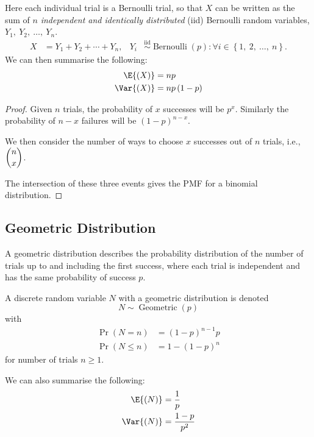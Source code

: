 \documentclass{article}
\begin{document}
Here each individual trial is a Bernoulli trial, so that \(X\) can be written as the sum of
\(n\) \textit{independent and identically distributed} (iid) Bernoulli random variables, \(Y_1,\: Y_2,\: \dots,\: Y_n\).
\begin{align*}
    X & = Y_1 + Y_2 + \cdots + Y_n, & Y_i & \overset{\mathrm{iid}}{\sim} \operatorname{Bernoulli}{\left( p \right)} : \forall i \in \left\{ 1,\: 2,\: \dots,\: n \right\}.
\end{align*}
We can then summarise the following:
\begin{align*}
    \E{\left( X \right)}   & = np                      \\
    \Var{\left( X \right)} & = np \left( 1 - p \right)
\end{align*}
\begin{proof}
    Given \(n\) trials, the probability of \(x\) successes will be \(p^x\).
    Similarly the probability of \(n - x\) failures will be \(\left( 1 - p \right)^{n - x}\).

    We then consider the number of ways to choose \(x\) successes out of \(n\) trials, i.e., \(\dbinom{n}{x}\).

    The intersection of these three events gives the PMF for a binomial distribution.
\end{proof}
\subsection{Geometric Distribution}
A geometric distribution describes the probability distribution of the number of trials up to and including
the first success, where each trial is independent and has the same probability of success \(p\).

A discrete random variable \(N\) with a geometric distribution is denoted
\begin{equation*}
    N \sim \operatorname{Geometric}{\left( p \right)}
\end{equation*}
with
\begin{align*}
    \Pr{\left( N = n \right)}    & = \left( 1 - p \right)^{n - 1} p \\
    \Pr{\left( N \leq n \right)} & = 1 - \left( 1 - p \right)^n
\end{align*}
for number of trials \(n \geq 1\).

We can also summarise the following:
\begin{align*}
    \E{\left( N \right)}   & = \frac{1}{p}       \\
    \Var{\left( N \right)} & = \frac{1 - p}{p^2}
\end{align*}
\end{document}
